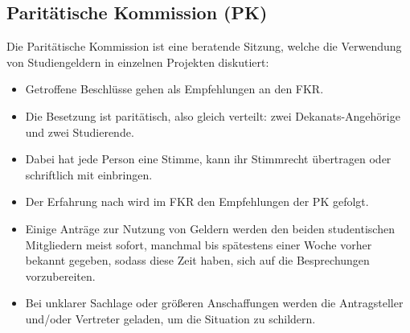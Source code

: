 \subsection{Paritätische Kommission (PK)}
Die Paritätische Kommission ist eine beratende Sitzung, welche die 
Verwendung von Studiengeldern in einzelnen Projekten diskutiert:
\begin{itemize}
\item Getroffene Beschlüsse gehen als Empfehlungen an den FKR. 
\item Die Besetzung ist paritätisch, also gleich verteilt: zwei Dekanats-Angehörige und zwei Studierende. 
\item Dabei hat jede Person eine Stimme, kann ihr Stimmrecht übertragen 
oder schriftlich mit einbringen. 
\item Der Erfahrung nach wird im FKR den Empfehlungen der PK gefolgt. 
\item Einige Anträge zur Nutzung von Geldern werden den beiden 
studentischen Mitgliedern meist sofort, manchmal bis spätestens 
einer Woche vorher bekannt gegeben, sodass diese Zeit haben, sich 
auf die Besprechungen vorzubereiten. 
\item Bei unklarer Sachlage oder größeren Anschaffungen werden die 
Antragsteller und/oder Vertreter geladen, um die Situation zu 
schildern.
\end{itemize}